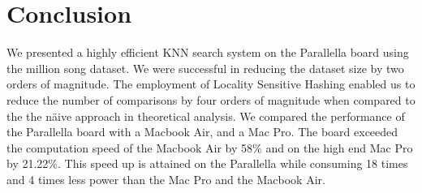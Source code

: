\section{Conclusion}
\label{sec: conclusion}
We presented a highly efficient KNN search system on the Parallella board using the million song dataset. 
We were successful in reducing the dataset size by two orders of magnitude. 
The employment of Locality Sensitive Hashing enabled us to reduce the number of comparisons by four orders of magnitude when compared to the the n\"{a}ive approach in theoretical analysis.
We compared the performance of the Parallella board with a Macbook Air, and a Mac Pro. The board exceeded the computation speed of the Macbook Air by 58\% and on the high end Mac Pro by 21.22\%. This speed up is attained on the Parallella while consuming 18 times and 4 times less power than the Mac Pro and the Macbook Air.